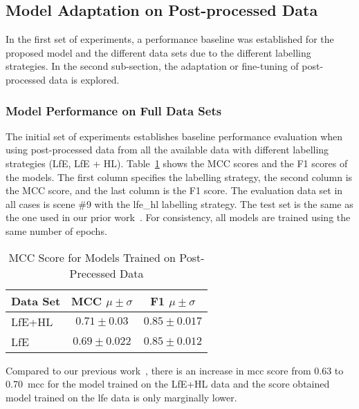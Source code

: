 \subsection{Model Adaptation on Post-processed Data}
\label{ch7:model_adpation_on_post_processed_data}
In the first set of experiments, a performance baseline was established for the proposed model and the different data sets due to the different labelling strategies. In the second sub-section, the adaptation or fine-tuning of post-processed data is explored. 

\subsubsection{Model Performance on Full Data Sets}
The initial set of experiments establishes baseline performance evaluation when using post-processed data from all the available data with different labelling strategies (LfE, LfE + HL). Table~\ref{tab:model_full_data_performance} shows the MCC scores and the F1 scores of the models. The first column specifies the labelling strategy, the second column is the MCC score, and the last column is the F1 score. The evaluation data set in all cases is scene \#9 with the \ac{lfe_hl} labelling strategy. The test set is the same as the one used in our prior work~\cite{ruetz2024foresttrav}. For consistency, all models are trained using the same number of epochs.

\begin{table}[h]
\centering
\caption{MCC Score for Models Trained on Post-Precessed Data}
\label{tab:model_full_data_performance}
\begin{tabular}{lcc}
\hline
Data Set &   MCC $ \mu \pm \sigma $ &  F1 $ \mu \pm \sigma$ \\
\hline    
LfE+HL    &     $0.71  \pm  0.03$    &       $0.85 \pm  0.017$   \\      
LfE        &    $0.69  \pm   0.022$     &       $0.85 \pm 0.012$   \\
\hline
\end{tabular}
\end{table}

Compared to our previous work~\cite{ruetz2024foresttrav}, there is an increase in \ac{mcc} score from 0.63 to 0.70~\ac{mcc} for the model trained on the LfE+HL data and the score obtained model trained on the \ac{lfe} data is only marginally lower.

